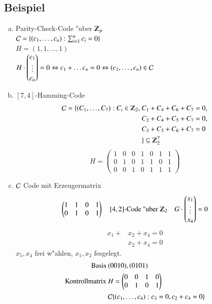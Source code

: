 \subsection{Beispiel}
\begin{enumerate}[a)]
	\item Parity-Check-Code "uber $\Z_p$ \\
	$\mathcal{C} = \lbrace (c_1,\ldots,c_n): \sum^n_{i=1}{c_i}=0 \rbrace$\\ %
	$H=(1,1,\ldots,1)$\\
	$H \cdot
	\begin{pmatrix}
	c_1 \\
	\vdots \\
	c_n
	\end{pmatrix}
	= 0 \Leftrightarrow c_1 + \ldots c_n = 0 \Leftrightarrow (c_1,\ldots,c_n) \in \mathcal{C}$
	\item $[7,4]$-Hamming-Code
	\begin{align*}
	\Code = \lbrace (C_1,\ldots,C_7) : C_i \in \Z_2,\ &C_1 + C_4 + C_6 + C_7 = 0,\\
										&C_2 + C_4 + C_5 + C_7 = 0,\\
										&C_3 + C_5 + C_6 + C_7 = 0\\
										 &\rbrace \subseteq \Z_2^7
	\end{align*}
	\[	H=
		\begin{pmatrix}
			1 & 0 & 0 & 1 & 0 & 1 & 1\\
			0 & 1 & 0 & 1 & 1 & 0 & 1\\
			0 & 0 & 1 & 0 & 1 & 1 & 1
		\end{pmatrix}
	\]
	\item $\mathcal{C}$ Code mit Erzeugermatrix\\
	\[
		\begin{pmatrix}
		1 & 1 & 0 & 1\\
		0 & 1 & 0 & 1
	\end{pmatrix}\quad [4,2]\text{-Code "uber } \Z_2\quad
	G \cdot
	\begin{pmatrix}
		x_1 \\	\vdots \\	x_4
	\end{pmatrix}=0
	\]	
	\begin{align*}
	 	x_1+&x_2 + x_4=0\\
	 		&x_2 + x_4 =0
	\end{align*}
	$x_5,x_4$ frei w"ahlen, $x_1,x_2$ fesgelegt.\\
\begin{align*}
		\text{Basis }&
		(0 0 1 0), (0 1 0 1)\\
		\text{Kontrollmatrix }&
		H=
		\begin{pmatrix}
			0 & 0 & 1 & 0 \\
			0 & 1 & 0 & 1
		\end{pmatrix}\\
		&\mathcal{C} \lbrace (c_1,\ldots,c_4) : c_3=0,c_2+c_4=0\rbrace
\end{align*}
\end{enumerate}

